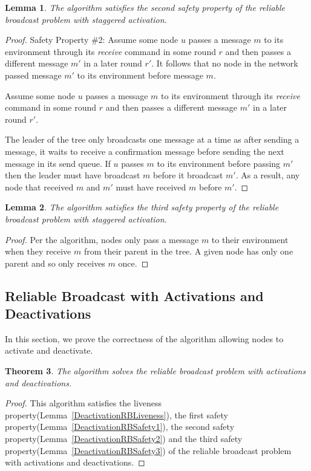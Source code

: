\documentclass[english]{article}
\newtheorem{theorem}{Theorem}[section]
\newtheorem{lemma}[theorem]{Lemma}
\begin{document}
\begin{lemma}
\label{StaggeredRBSafety2}
The algorithm satisfies the second safety property of the reliable broadcast problem with staggered activation.
\end{lemma}
\begin{proof}
Safety Property \#2: Assume some node $u$ passes a message $m$ to its environment through its \textit{receive} command in some round $r$ and then passes a different message $m'$ in a later round $r'$. It follows that no node in the network passed message $m'$ to its environment before message $m$. 

Assume some node $u$ passes a message $m$ to its environment through its \textit{receive} command in some round $r$ and then passes a different message $m'$ in a later round $r'$. 

The leader of the tree only broadcasts one message at a time as after sending a message, it waits to receive a confirmation message before sending the next message in its send queue. If $u$ passes $m$ to its environment before passing $m'$ then the leader must have broadcast $m$ before it broadcast $m'$. As a result, any node that received $m$ and $m'$ must have received $m$ before $m'$.

\end{proof}

\begin{lemma}
\label{StaggeredRBSafety3}
The algorithm satisfies the third safety property of the reliable broadcast problem with staggered activation.
\end{lemma}
\begin{proof}

Per the algorithm, nodes only pass a message $m$ to their environment when they receive $m$ from their parent in the tree. A given node has only one parent and so only receives $m$ once.

\end{proof}



\subsection {Reliable Broadcast with Activations and Deactivations}

In this section, we prove the correctness of the algorithm allowing nodes to activate and deactivate.

\begin{theorem}
\label{DeactivationReliableBroadcast}
The algorithm solves the reliable broadcast problem with activations and deactivations.
\end{theorem}
\begin{proof}
This algorithm satisfies the liveness property(Lemma~\ref{DeactivationRBLiveness}), 
the first safety property(Lemma~\ref{DeactivationRBSafety1}),
the second safety property(Lemma~\ref{DeactivationRBSafety2}) and 
the third safety property(Lemma~\ref{DeactivationRBSafety3}) of the reliable broadcast problem with activations and deactivations.
\end{proof}
\end{document}

